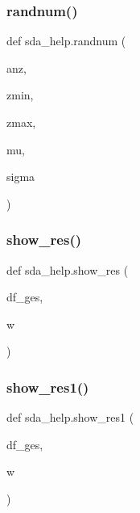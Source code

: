 \mbox{\label{namespacesda__help_abf8f9f4f5d524da32e1379331edaf208}} 
\subsubsection{\texorpdfstring{randnum()}{randnum()}}
{\footnotesize\ttfamily def sda\+\_\+help.\+randnum (\begin{DoxyParamCaption}\item[{}]{anz,  }\item[{}]{zmin,  }\item[{}]{zmax,  }\item[{}]{mu,  }\item[{}]{sigma }\end{DoxyParamCaption})}

\mbox{\label{namespacesda__help_a74d41be925e950eda99464e5dd3d7428}} 
\subsubsection{\texorpdfstring{show\+\_\+res()}{show\_res()}}
{\footnotesize\ttfamily def sda\+\_\+help.\+show\+\_\+res (\begin{DoxyParamCaption}\item[{}]{df\+\_\+ges,  }\item[{}]{w }\end{DoxyParamCaption})}

\mbox{\label{namespacesda__help_a1bc0f27de2fc69f1624a834c1aec98bb}} 
\subsubsection{\texorpdfstring{show\+\_\+res1()}{show\_res1()}}
{\footnotesize\ttfamily def sda\+\_\+help.\+show\+\_\+res1 (\begin{DoxyParamCaption}\item[{}]{df\+\_\+ges,  }\item[{}]{w }\end{DoxyParamCaption})}

